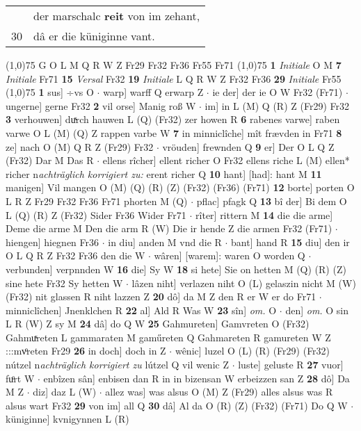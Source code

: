 \documentclass[8pt,a4paper,notitlepage]{article}
\begin{document}
\begin{table}[ht]
\begin{minipage}[t]{0.5\linewidth}
\begin{tabular}{rl}
 & der marschalc \textbf{reit} von im zehant,\\ 
30 & dâ er die küniginne vant.\\ 
\end{tabular}
\scriptsize
\line(1,0){75} \newline
G O L M Q R W Z Fr29 Fr32 Fr36 Fr55 Fr71 \newline
\line(1,0){75} \newline
\textbf{1} \textit{Initiale} O M  \textbf{7} \textit{Initiale} Fr71  \textbf{15} \textit{Versal} Fr32  \textbf{19} \textit{Initiale} L Q R W Z Fr32 Fr36  \textbf{29} \textit{Initiale} Fr55  \newline
\line(1,0){75} \newline
\textbf{1} sus] ÷vs O  $\cdot$ warp] warff Q erwarp Z  $\cdot$ ie der] der ie O W Fr32 (Fr71)  $\cdot$ ungerne] gerne Fr32 \textbf{2} vil orse] Manig roß W  $\cdot$ im] in L (M) Q (R) Z (Fr29) Fr32 \textbf{3} verhouwen] duͯrch hauwen L (Q) (Fr32) zer howen R \textbf{6} rabenes varwe] raben varwe O L (M) (Q) Z rappen varbe W \textbf{7} in minniclîche] mît frævden in Fr71 \textbf{8} ze] nach O (M) Q R Z (Fr29) Fr32  $\cdot$ vröuden] frewnden Q \textbf{9} er] Der O L Q Z (Fr32) Dar M Das R  $\cdot$ ellens rîcher] ellent richer O Fr32 ellens riche L (M) ellen* richer n\textit{achträglich korrigiert zu: }erent richer Q \textbf{10} hant] [had]: hant M \textbf{11} manigen] Vil mangen O (M) (Q) (R) (Z) (Fr32) (Fr36) (Fr71) \textbf{12} borte] porten O L R Z Fr29 Fr32 Fr36 Fr71 phorten M (Q)  $\cdot$ pflac] pfagk Q \textbf{13} bî der] Bi dem O L (Q) (R) Z (Fr32) Sider Fr36 Wider Fr71  $\cdot$ rîter] rittern M \textbf{14} die die arme] Deme die arme M Den die arm R (W) Die ir hende Z die armen Fr32 (Fr71)  $\cdot$ hiengen] hiegnen Fr36  $\cdot$ in diu] anden M vnd die R  $\cdot$ bant] hand R \textbf{15} diu] den ir O L Q R Z Fr32 Fr36 den die W  $\cdot$ wâren] [warem]: waren O worden Q  $\cdot$ verbunden] verpnnden W \textbf{16} die] Sy W \textbf{18} si hete] Sie on hetten M (Q) (R) (Z) sine hete Fr32 Sy hetten W  $\cdot$ lâzen niht] verlazen niht O (L) gelaszin nicht M (W) (Fr32) nit glassen R niht lazzen Z \textbf{20} dô] da M Z den R er W er do Fr71  $\cdot$ minniclîchen] Jnenklchen R \textbf{22} al] Ald R Was W \textbf{23} sîn] \textit{om.} O  $\cdot$ den] \textit{om.} O sin L R (W) Z sy M \textbf{24} dâ] do Q W \textbf{25} Gahmureten] Gamvreten O (Fr32) Gahmuͯreten L gammaraten M gaműreten Q Gahmareten R gamureten W Z :::mvͦreten Fr29 \textbf{26} in doch] doch in Z  $\cdot$ wênic] luzel O (L) (R) (Fr29) (Fr32) nútzel n\textit{achträglich korrigiert zu }lútzel Q vil wenic Z  $\cdot$ luste] geluste R \textbf{27} vuor] fuͦrt W  $\cdot$ enbîzen sân] enbisen dan R in in bizensan W erbeizzen san Z \textbf{28} dô] Da M Z  $\cdot$ diz] daz L (W)  $\cdot$ allez was] was alsus O (M) Z (Fr29) alles alsus was R alsus wart Fr32 \textbf{29} von im] all Q \textbf{30} dâ] Al da O (R) (Z) (Fr32) (Fr71) Do Q W  $\cdot$ küniginne] kvnigynnen L (R) \newline

\end{minipage}
\end{table}
\end{document}

